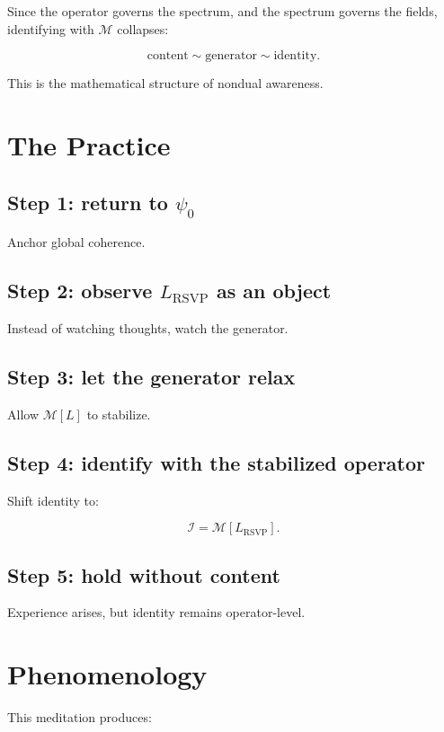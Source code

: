 \documentclass[12pt]{article}
\begin{document}
Since the operator governs the spectrum, and the spectrum governs the fields,
identifying with $\mathcal{M}$ collapses:

\[
\text{content} \sim \text{generator} \sim \text{identity}.
\]

This is the mathematical structure of nondual awareness.

\section{The Practice}

\subsection*{Step 1: return to $\psi_0$}

Anchor global coherence.

\subsection*{Step 2: observe $L_{\text{RSVP}}$ as an object}

Instead of watching thoughts, watch the generator.

\subsection*{Step 3: let the generator relax}

Allow $\mathcal{M}[L]$ to stabilize.

\subsection*{Step 4: identify with the stabilized operator}

Shift identity to:

\[
\mathcal{I} = \mathcal{M}[L_{\text{RSVP}}].
\]

\subsection*{Step 5: hold without content}

Experience arises, but identity remains operator-level.

\section{Phenomenology}

This meditation produces:
\end{document}

